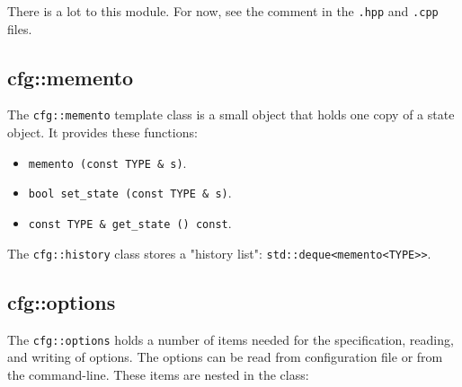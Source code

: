    There is a lot to this module.
   For now, see the comment in the \texttt{.hpp} and \texttt{.cpp} files.

\subsection{cfg::memento}
\label{subsec:cfg_namespace_memento}

   The \texttt{cfg::memento} template class is a small object that holds one
   copy of a state object.
   It provides these functions:

   \begin{itemize}
      \item \texttt{memento (const TYPE \& s)}.
      \item \texttt{bool set\_state (const TYPE \& s)}.
      \item \texttt{const TYPE \& get\_state () const}.
   \end{itemize}

   The \texttt{cfg::history} class stores a "history list":
   \texttt{std::deque<memento<TYPE>>}.

\subsection{cfg::options}
\label{subsec:cfg_namespace_options}

   The \texttt{cfg::options} holds a number of items needed for the
   specification, reading, and writing of options.
   The options can be read from configuration file or from the command-line.
   These items are nested in the class:

